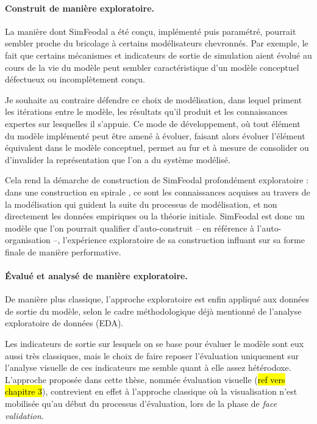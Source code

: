 \paragraph{Construit de manière exploratoire.}

La manière dont SimFeodal a été conçu, implémenté puis paramétré, pourrait sembler proche du \og bricolage\fg{} à certains modélisateurs chevronnés.
Par exemple, le fait que certains mécanismes et indicateurs de sortie de simulation aient évolué au cours de la vie du modèle peut sembler caractéristique d'un modèle conceptuel défectueux ou incomplètement conçu.

Je souhaite au contraire défendre ce choix de modélisation, dans lequel priment les itérations entre le modèle, les résultats qu'il produit et les connaissances expertes sur lesquelles il s'appuie.
Ce mode de développement, où tout élément du modèle implémenté peut être amené à évoluer, faisant alors évoluer l'élément équivalent dans le modèle conceptuel, permet au fur et à mesure de consolider ou d'invalider la représentation que l'on a du système modélisé.

Cela rend la démarche de construction de SimFeodal profondément exploratoire :
dans une construction \og en spirale\fg{} \autocite[157]{mathian_objets_2014}, ce sont les connaissances acquises au travers de la modélisation qui guident la suite du processus de modélisation, et non directement les données empiriques ou la théorie initiale.
SimFeodal est donc un modèle que l'on pourrait qualifier d'\og auto-construit\fg{} -- en référence à l'auto-organisation --, l'expérience exploratoire de sa construction influant sur sa forme finale de manière performative.

\paragraph{Évalué et analysé de manière exploratoire.}
De manière plus classique, l'approche exploratoire est enfin appliqué aux données de sortie du modèle, selon le cadre méthodologique déjà mentionné de l'analyse exploratoire de données (EDA).

Les indicateurs de sortie sur lesquels on se base pour évaluer le modèle sont eux aussi très classiques, mais le choix de faire reposer l'évaluation uniquement sur l'analyse visuelle de ces indicateurs me semble quant à elle assez hétérodoxe.
L'approche proposée dans cette thèse, nommée \og évaluation visuelle\fg{} (\hl{ref vers chapitre 3}), contrevient en effet à l'approche classique où la visualisation n'est mobilisée qu'au début du processus d'évaluation, lors de la phase de \og \textit{face validation}\fg{}.

